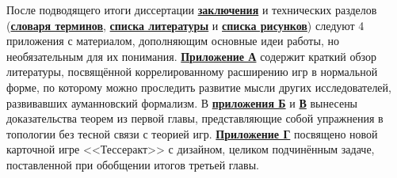
%

После подводящего итоги диссертации \underline{\textbf{заключения}} и технических разделов (\underline{\textbf{словаря терминов}}, \underline{\textbf{списка литературы}} и \underline{\textbf{списка рисунков}}) следуют 4 приложения с материалом, дополняющим основные идеи работы, но необязательным для их понимания. \underline{\textbf{Приложение А}} содержит краткий обзор литературы, посвящённой коррелированному расширению игр в нормальной форме, по которому можно проследить развитие мысли других исследователей, развивавших ауманновский формализм. В \underline{\textbf{приложения Б}} и \underline{\textbf{В}} вынесены доказательства теорем из первой главы, представляющие собой упражнения в топологии без тесной связи с теорией игр. \underline{\textbf{Приложение Г}} посвящено новой карточной игре <<Тессеракт>> с дизайном, целиком подчинённым задаче, поставленной при обобщении итогов третьей главы.

